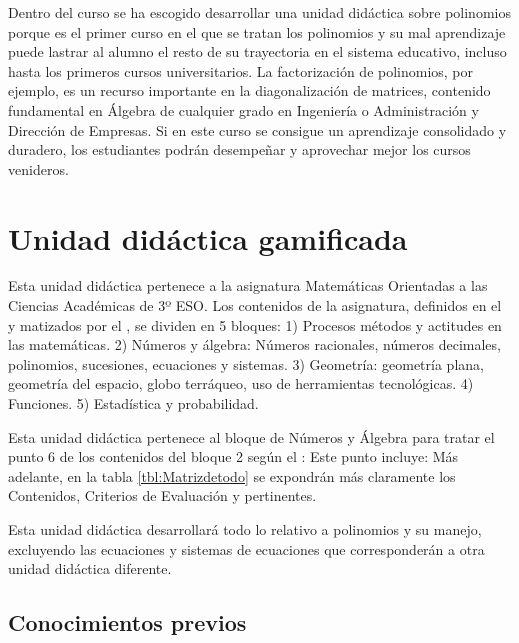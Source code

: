 Dentro del curso se ha escogido desarrollar una unidad didáctica sobre polinomios porque es el primer curso en el que se tratan los polinomios y su mal aprendizaje puede lastrar al alumno el resto de su trayectoria en el sistema educativo, incluso hasta los primeros cursos universitarios.
%
La factorización de polinomios, por ejemplo, es un recurso importante en la diagonalización de matrices, contenido fundamental en Álgebra de cualquier grado en Ingeniería o Administración y Dirección de Empresas.
%
Si en este curso se consigue un aprendizaje consolidado y duradero, los estudiantes podrán desempeñar y aprovechar mejor los cursos venideros.


\section{Unidad didáctica gamificada}

\label{sec:UD}
%
Esta unidad didáctica pertenece a la asignatura Matemáticas Orientadas a las Ciencias Académicas de 3º ESO. 
%
Los contenidos de la asignatura, definidos en el \boe y matizados por el \bocm, se dividen en 5 bloques:
1) Procesos métodos y actitudes en las matemáticas. 
2) Números y álgebra: Números racionales, números decimales, polinomios, sucesiones, ecuaciones y sistemas.
3) Geometría: geometría plana, geometría del espacio, globo terráqueo, uso de herramientas tecnológicas.
4) Funciones.
5) Estadística y probabilidad.

Esta unidad didáctica pertenece al bloque de Números y Álgebra para tratar el punto 6 de los contenidos del bloque 2 según el \bocm: 
%
Este punto incluye:
%
%
Más adelante, en la tabla \ref{tbl:Matrizdetodo} se expondrán más claramente los Contenidos, Criterios de Evaluación y \eaes pertinentes.

Esta unidad didáctica desarrollará todo lo relativo a polinomios y su manejo, excluyendo las ecuaciones y sistemas de ecuaciones que corresponderán a otra unidad didáctica diferente.

\subsection{Conocimientos previos}

